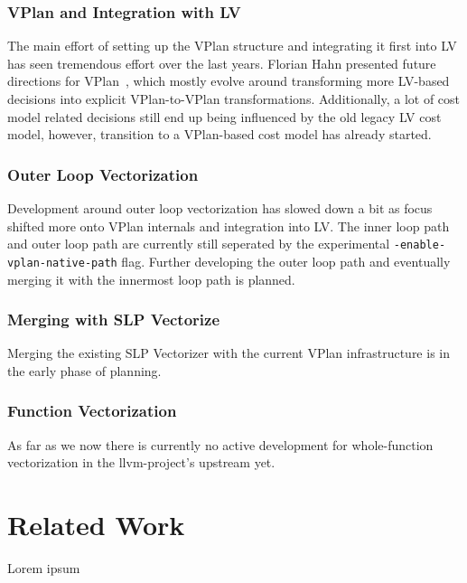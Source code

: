 \documentclass[sigplan,11pt,nonacm]{acmart}
\begin{document}
\subsubsection{VPlan and Integration with LV}
The main effort of setting up the VPlan structure and integrating it first into LV has seen
tremendous effort over the last years. Florian Hahn presented future directions for 
VPlan~\cite{llvmvplanupdate}, which mostly evolve around transforming more LV-based decisions into
explicit VPlan-to-VPlan transformations. Additionally, a lot of cost model related decisions 
still end up being influenced by the old legacy LV cost model, however, transition to a VPlan-based 
cost model has already started.

\subsubsection{Outer Loop Vectorization}
Development around outer loop vectorization has slowed down a bit as focus shifted more onto VPlan
internals and integration into LV. The inner loop path and outer loop path are currently still
seperated by the experimental \texttt{-enable-\allowbreak vplan-\allowbreak native-\allowbreak path} 
flag. Further developing the 
outer loop path and eventually merging it with the innermost loop path is planned.

\subsubsection{Merging with SLP Vectorize}
Merging the existing SLP Vectorizer with the current VPlan infrastructure is in the early phase
of planning.

\subsubsection{Function Vectorization}
As far as we now there is currently no active development for whole-function vectorization in the
llvm-project's upstream yet.




\section{Related Work}
\label{sec:relatedwork}
Lorem ipsum
\end{document}
